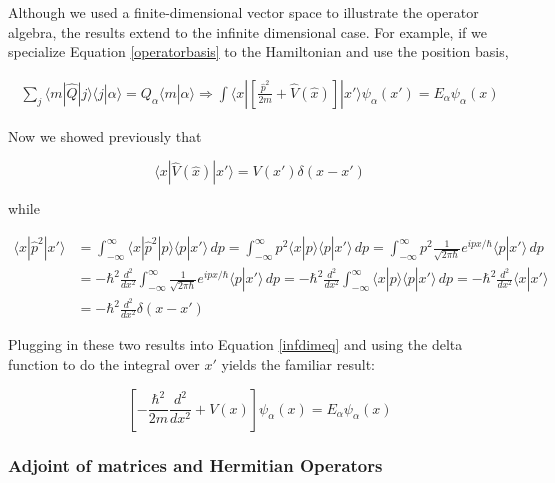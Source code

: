 Although we used a finite-dimensional vector space to illustrate the operator
algebra, the results extend to the infinite dimensional case. For example, if
we specialize Equation \ref{operatorbasis} to the Hamiltonian and use the
position basis, 

\begin{align} \label{infdimeq}
  \sum_{j}^{} \langle m | \hat{Q} | j\rangle \langle j | \alpha \rangle
  = Q_\alpha \langle m | \alpha \rangle \Rightarrow \int \langle x | \left[
  \frac{\hat{p}^2}{2m} + \hat{V}(\hat{x}) \right] |x'\rangle \psi_\alpha(x')
  = E_\alpha \psi_\alpha(x)
\end{align}\vspace{3px}

Now we showed previously that 

\[
\langle x | \hat{V}(\hat{x}) | x'\rangle = V(x')\delta(x-x')
\] \vspace{3px}

while 

\begin{align} \label{}
  \langle x | \hat{p}^2 | x' \rangle &= \int_{-\infty}^{\infty} \langle
  x | \hat{p}^2 | p \rangle \langle p | x' \rangle \, dp
  = \int_{-\infty}^{\infty} p^2 \langle x | p \rangle \langle p | x' \rangle \,
  dp = \int_{-\infty}^{\infty} p^2 \frac{1}{\sqrt{2\pi\hbar}}e^{ipx / \hbar}
  \langle p | x'\rangle \, dp \\ 
  &= -\hbar^2 \frac{d^2}{d x^2} \int_{-\infty}^{\infty}
  \frac{1}{\sqrt{2\pi\hbar}} e^{ipx / \hbar} \langle p | x' \rangle \, dp
  = -\hbar^2 \frac{d^2 }{d x^2} \int_{-\infty}^{\infty} \langle x|p \rangle
  \langle p|x' \rangle \, dp = -\hbar^2 \frac{d^2 }{d x^2} \langle x|x' \rangle
  \\ &= -\hbar^2 \frac{d^2 }{d x^2} \delta(x-x')
\end{align}\vspace{3px}


Plugging in these two results into Equation \ref{infdimeq} and using the delta
function to do the integral over $x'$ yields the familiar result: 

\[
  \left[ -\frac{\hbar^2}{2m} \frac{d^2 }{d x^2} + V(x) \right] \psi_\alpha(x)
  = E_\alpha \psi_\alpha(x)
\] \vspace{3px}

\subsubsection{Adjoint of matrices and Hermitian Operators} 

